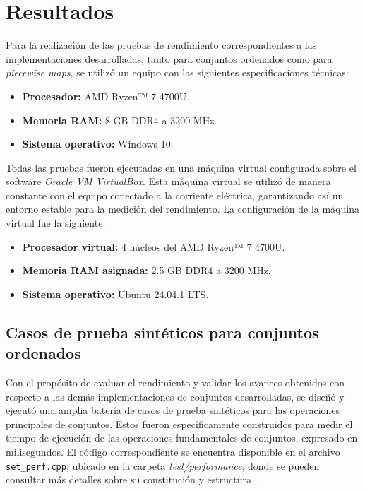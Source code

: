 \chapter{Resultados}

Para la realización de las pruebas de rendimiento correspondientes a las implementaciones desarrolladas, tanto para conjuntos ordenados como para \textit{piecewise maps}, se utilizó un equipo con las siguientes especificaciones técnicas:

\begin{itemize}
    \item \textbf{Procesador:} AMD Ryzen™ 7 4700U.
    \item \textbf{Memoria RAM:} 8 GB DDR4 a 3200 MHz.
    \item \textbf{Sistema operativo:} Windows 10.
\end{itemize}

Todas las pruebas fueron ejecutadas en una máquina virtual configurada sobre el software \textit{Oracle VM VirtualBox}. Esta máquina virtual se utilizó de manera constante con el equipo conectado a la corriente eléctrica, garantizando así un entorno estable para la medición del rendimiento. La configuración de la máquina virtual fue la siguiente:

\begin{itemize}
    \item \textbf{Procesador virtual:} 4 núcleos del AMD Ryzen™ 7 4700U.
    \item \textbf{Memoria RAM asignada:} 2.5 GB DDR4 a 3200 MHz.
    \item \textbf{Sistema operativo:} Ubuntu 24.04.1 LTS.
\end{itemize}

\section{Casos de prueba sintéticos para conjuntos ordenados}

Con el propósito de evaluar el rendimiento y validar los avances obtenidos con respecto a las demás implementaciones de conjuntos desarrolladas, se diseñó y ejecutó una amplia batería de casos de prueba sintéticos para las operaciones principales de conjuntos. Estos fueron específicamente construidos para medir el tiempo de ejecución de las operaciones fundamentales de conjuntos, expresado en milisegundos. El código correspondiente se encuentra disponible en el archivo \texttt{set\_perf.cpp}, ubicado en la carpeta \textit{test/performance}, donde se pueden consultar más detalles sobre su constitución y estructura \cite{sbg}.

